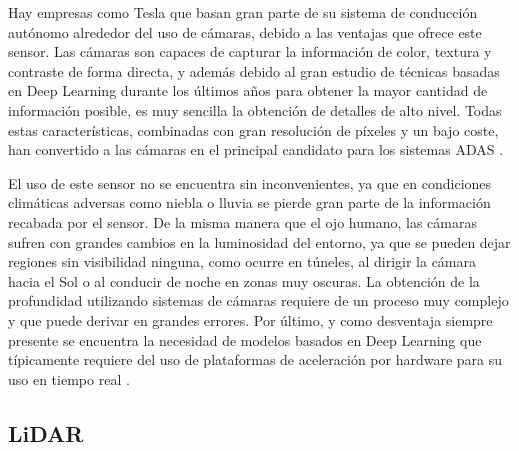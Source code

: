 
Hay empresas como Tesla que basan gran parte de su sistema de conducción autónomo alrededor del uso de cámaras, debido a las ventajas que ofrece este sensor. Las cámaras son capaces de capturar la información de color, textura y contraste de forma directa, y además debido al gran estudio de técnicas basadas en Deep Learning durante los últimos años para obtener la mayor cantidad de información posible, es muy sencilla la obtención de detalles de alto nivel. Todas estas características, combinadas con gran resolución de píxeles y un bajo coste, han convertido a las cámaras en el principal candidato para los sistemas \ac{ADAS} \cite{advantages_camera}.

El uso de este sensor no se encuentra sin inconvenientes, ya que en condiciones climáticas adversas como niebla o lluvia se pierde gran parte de la información recabada por el sensor. De la misma manera que el ojo humano, las cámaras sufren con grandes cambios en la luminosidad del entorno, ya que se pueden dejar regiones sin visibilidad ninguna, como ocurre en túneles, al dirigir la cámara hacia el Sol o al conducir de noche en zonas muy oscuras. La obtención de la profundidad utilizando sistemas de cámaras requiere de un proceso muy complejo y que puede derivar en grandes errores. Por último, y como desventaja siempre presente se encuentra la necesidad de modelos basados en Deep Learning que típicamente requiere del uso de plataformas de aceleración por hardware para su uso en tiempo real \cite{paper_comparison_lidar_camera}.

\subsection{LiDAR}
\label{sec:LiDAR}

